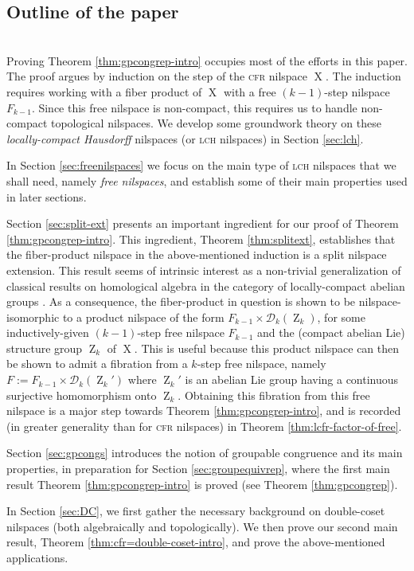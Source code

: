 \documentclass[a4paper,12pt,reqno]{amsart}
\theoremstyle{definition}
\newcommand{\mc}{\mathcal}
\DeclareMathOperator{\ab}{Z}
\DeclareMathOperator{\ns}{X}
\begin{document}
\subsection{Outline of the paper}\hfill\smallskip\\
Proving Theorem \ref{thm:gpcongrep-intro} occupies most of the efforts in this paper. The proof argues by induction on the step of the \textsc{cfr} nilspace $\ns$. The induction requires working with a fiber product of $\ns$ with a free $(k-1)$-step nilspace $F_{k-1}$. Since this free nilspace is non-compact, this requires us to handle non-compact topological nilspaces. We develop some groundwork theory on these \emph{locally-compact Hausdorff} nilspaces (or \textsc{lch} nilspaces) in Section \ref{sec:lch}.

In Section \ref{sec:freenilspaces} we focus on the main type of \textsc{lch} nilspaces that we shall need, namely \emph{free nilspaces}, and establish some of their main properties used in later sections. 

Section \ref{sec:split-ext} presents an important ingredient for our proof of  Theorem \ref{thm:gpcongrep-intro}. This ingredient, Theorem \ref{thm:splitext}, establishes that the fiber-product nilspace in the above-mentioned induction is a split nilspace extension. This result seems of intrinsic interest as a non-trivial generalization of classical results on homological algebra in the category of locally-compact abelian groups \cite{Mosk}. As a consequence, the fiber-product in question is shown to be nilspace-isomorphic to a product nilspace of the form $F_{k-1}\times\mc{D}_k(\ab_k)$, for some inductively-given $(k-1)$-step free nilspace $F_{k-1}$ and the (compact abelian Lie) structure group $\ab_k$ of $\ns$. This is useful because this product nilspace can then be shown to admit a fibration from a $k$-step free nilspace, namely $F:=F_{k-1}\times\mc{D}_k(\ab_k')$ where $\ab_k'$ is an abelian Lie group having a continuous surjective homomorphism onto $\ab_k$. Obtaining this fibration from this free nilspace is a major step towards Theorem \ref{thm:gpcongrep-intro}, and is recorded (in greater generality than  for \textsc{cfr} nilspaces) in Theorem \ref{thm:lcfr-factor-of-free}.

Section \ref{sec:gpcongs} introduces the notion of groupable congruence and its main properties, in preparation for Section \ref{sec:groupequivrep}, where the first main result Theorem \ref{thm:gpcongrep-intro}  is proved (see Theorem \ref{thm:gpcongrep}).

In Section \ref{sec:DC}, we first gather the necessary background on double-coset nilspaces (both algebraically and topologically).  We then prove our second main result, Theorem \ref{thm:cfr=double-coset-intro}, and prove the above-mentioned applications.
\end{document}
